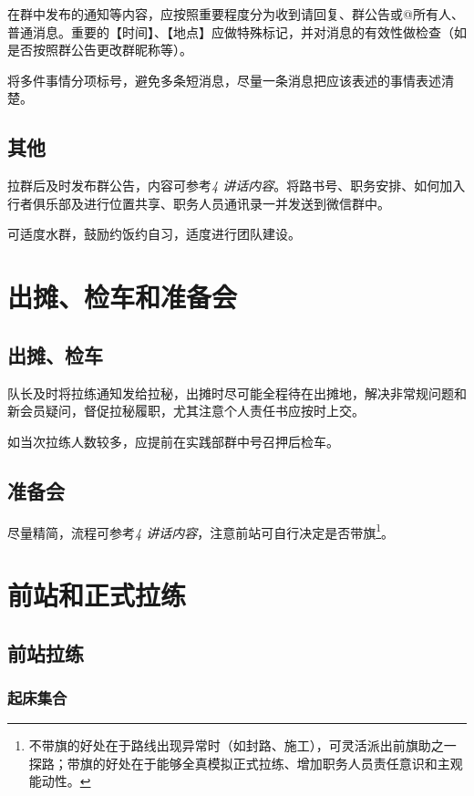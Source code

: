 \documentclass[UTF8]{ctexart}
\begin{document}
在群中发布的通知等内容，应按照重要程度分为收到请回复、群公告或@所有人、普通消息。重要的【时间】、【地点】应做特殊标记，并对消息的有效性做检查（如是否按照群公告更改群昵称等）。

将多件事情分项标号，避免多条短消息，尽量一条消息把应该表述的事情表述清楚。

\subsection{其他}

拉群后及时发布群公告，内容可参考{\color{blue}\textit{4 讲话内容}}。将路书号、职务安排、如何加入行者俱乐部及进行位置共享、职务人员通讯录一并发送到微信群中。

可适度水群，鼓励约饭约自习，适度进行团队建设。

\section{出摊、检车和准备会}

\subsection{出摊、检车}

队长及时将拉练通知发给拉秘，出摊时尽可能全程待在出摊地，解决非常规问题和新会员疑问，督促拉秘履职，尤其注意个人责任书应按时上交。

如当次拉练人数较多，应提前在实践部群中号召押后检车。

\subsection{准备会}

尽量精简，流程可参考{\color{blue}\textit{4 讲话内容}}，注意前站可自行决定是否带旗\footnote{不带旗的好处在于路线出现异常时（如封路、施工），可灵活派出前旗助之一探路；带旗的好处在于能够全真模拟正式拉练、增加职务人员责任意识和主观能动性。}。

\section{前站和正式拉练}

\subsection{前站拉练}

\subsubsection{起床集合}
\end{document}
